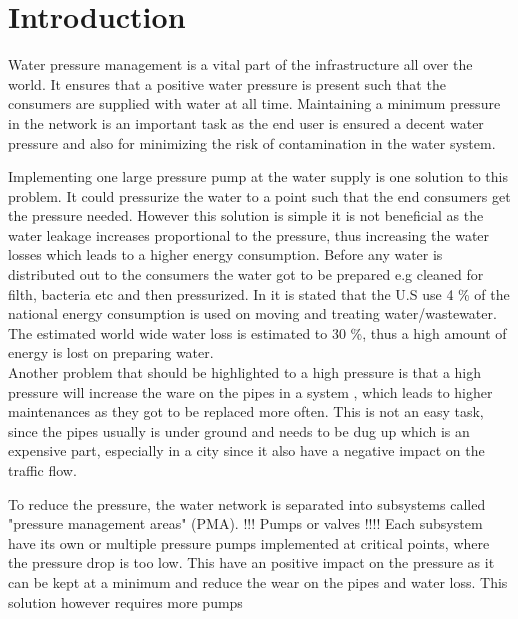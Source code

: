 \chapter{Introduction}

Water pressure management is a vital part of the infrastructure all over the world. It ensures that a positive water pressure is present such that the consumers are supplied with water at all time. Maintaining a minimum pressure in the network is an important task as the end user is ensured a decent water pressure and also for minimizing the risk of contamination in the water system\cite{national2005public}.%

Implementing one large pressure pump at the water supply is one solution to this problem. It could pressurize the water to a point such that the end consumers get the pressure needed. However this solution is simple it is not beneficial as the water leakage increases proportional to the pressure\cite{feldman2009aspects}, thus increasing the water losses which leads to a higher energy consumption. Before any water is distributed out to the consumers the water got to be prepared e.g cleaned for filth, bacteria etc and then pressurized. In \cite{appelbaum2002water} it is stated that the U.S use 4 \% of the national energy consumption is used on moving and treating water/wastewater. The estimated world wide water loss is estimated to 30 \%\cite{feldman2009aspects}, thus a high amount of energy is lost on preparing water.\\ 
Another problem that should be highlighted to a high pressure is that a high pressure will increase the ware on the pipes in a system\cite{Watts_water} , which leads to higher maintenances as they got to be replaced more often. This is not an easy task, since the pipes usually is under ground and needs to be dug up which is an expensive part, especially in a city since it also have a negative impact on the traffic flow. 

To reduce the pressure, the water network is separated into subsystems called "pressure management areas" (PMA). !!! Pumps or valves !!!! 
Each subsystem have its own or multiple pressure pumps implemented at critical points, where the pressure drop is too low. This have an positive impact on the pressure as it can be kept at a minimum and reduce the wear on the pipes and water loss. This solution however requires more pumps 







